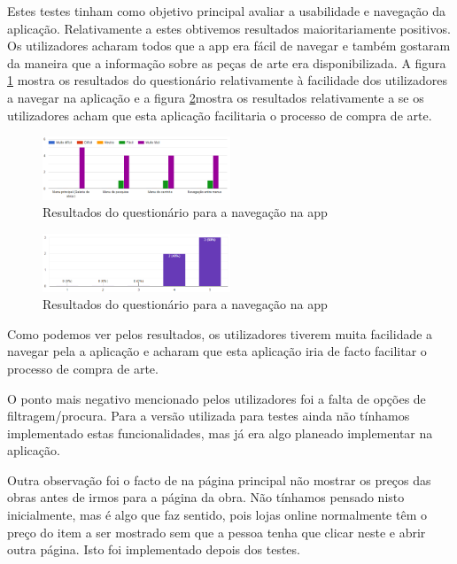 \documentclass[conference]{IEEEtran}
\begin{document}
Estes testes tinham como objetivo principal avaliar a usabilidade e navegação da aplicação. 
Relativamente a estes obtivemos resultados maioritariamente positivos. 
Os utilizadores acharam todos que a app era fácil de navegar e também gostaram da maneira 
que a informação sobre as peças de arte era disponibilizada. A figura
\ref{fig:navegacaoTest} mostra os resultados do questionário relativamente 
à facilidade dos utilizadores a navegar na aplicação e a figura
\ref{fig:facilitaTest}mostra os resultados relativamente a se os utilizadores 
acham que esta aplicação facilitaria o processo de compra de arte.

\begin{figure}[ht]
    \centering
    \includegraphics[width=0.5\textwidth]{questionarioNavegacao.png}
    \caption{Resultados do questionário para a navegação na app}
    \label{fig:navegacaoTest}
\end{figure}

\begin{figure}[ht]
    \centering
    \includegraphics[width=0.5\textwidth]{questionarioFacilitar.png}
    \caption{Resultados do questionário para a navegação na app}
    \label{fig:facilitaTest}
\end{figure}

Como podemos ver pelos resultados, os utilizadores tiverem muita facilidade a navegar 
pela a aplicação e acharam que esta aplicação iria de facto facilitar o processo de compra de arte.

O ponto mais negativo mencionado pelos utilizadores foi a falta de opções de filtragem/procura. 
Para a versão utilizada para testes ainda não tínhamos implementado estas funcionalidades, 
mas já era algo planeado implementar na aplicação.

Outra observação foi o facto de na página principal não mostrar os preços das obras 
antes de irmos para a página da obra. Não tínhamos pensado nisto inicialmente, 
mas é algo que faz sentido, pois lojas online normalmente têm o preço do item a ser 
mostrado sem que a pessoa tenha que clicar neste e abrir outra página. 
Isto foi implementado depois dos testes.
\end{document}

